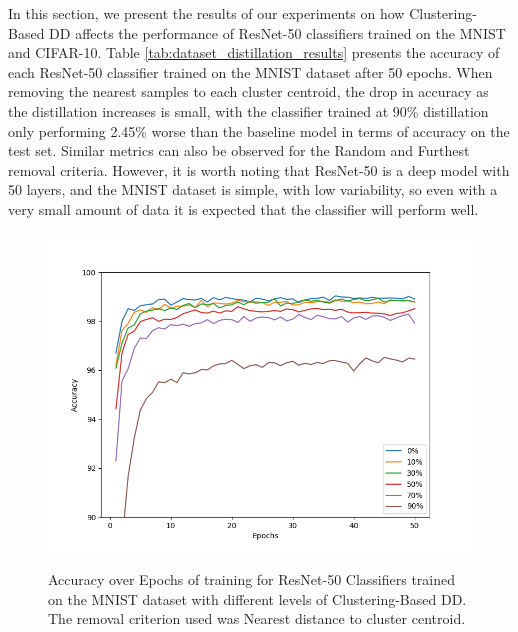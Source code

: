 In this section, we present the results of our experiments on how Clustering-Based DD affects the performance of ResNet-50 classifiers trained on the MNIST and CIFAR-10. Table \ref{tab:dataset_distillation_results} presents the accuracy of each ResNet-50 classifier trained on the MNIST dataset after 50 epochs. When removing the nearest samples to each cluster centroid, the drop in accuracy as the distillation increases is small, with the classifier trained at 90\% distillation only performing 2.45\% worse than the baseline model in terms of accuracy on the test set. Similar metrics can also be observed for the Random and Furthest removal criteria. However, it is worth noting that ResNet-50 is a deep model with 50 layers, and the MNIST dataset is simple, with low variability, so even with a very small amount of data it is expected that the classifier will perform well.

\begin{figure}
    \centering
    \caption[Accuracy on MNIST using sample removal on nearest distance to cluster centroid]{Accuracy over Epochs of training for ResNet-50 Classifiers trained on the MNIST dataset with different levels of Clustering-Based DD. The removal criterion used was Nearest distance to cluster centroid.}
    \includegraphics[width=1\linewidth]{mnist_results.png}
    \label{fig:mnist_results_dd}
\end{figure}

